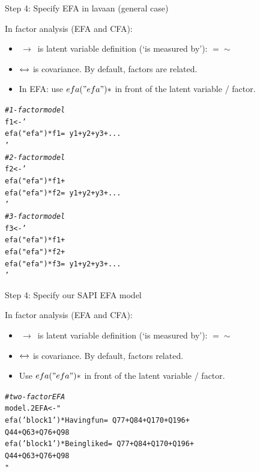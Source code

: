 \documentclass[10pt]{beamer}\usepackage[]{graphicx}\usepackage[]{xcolor}
\makeatletter
\newcommand{\hlstr}[1]{\textcolor[rgb]{0.192,0.494,0.8}{#1}}%
\newcommand{\hlcom}[1]{\textcolor[rgb]{0.678,0.584,0.686}{\textit{#1}}}%
\newcommand{\hlstd}[1]{\textcolor[rgb]{0.345,0.345,0.345}{#1}}%
\newcommand{\hlkwb}[1]{\textcolor[rgb]{0.69,0.353,0.396}{#1}}%
\newenvironment{kframe}{%
 \def\at@end@of@kframe{}%
 \ifinner\ifhmode%
  \def\at@end@of@kframe{\end{minipage}}%
  \begin{minipage}{\columnwidth}%
 \fi\fi%
 \def\FrameCommand##1{\hskip\@totalleftmargin \hskip-\fboxsep
 \colorbox{shadecolor}{##1}\hskip-\fboxsep
     \hskip-\linewidth \hskip-\@totalleftmargin \hskip\columnwidth}%
 \MakeFramed {\advance\hsize-\width
   \@totalleftmargin\z@ \linewidth\hsize
   \@setminipage}}%
 {\par\unskip\endMakeFramed%
 \at@end@of@kframe}
\newenvironment{knitrout}{}{} %
\makeatother
\begin{document}
%
\begin{frame}[fragile]{Step 4: Specify EFA in lavaan (general case)}

In factor analysis (EFA and CFA):
\begin{itemize}
  \item $\,\to\,$ is latent variable definition (`is measured by'): $=\sim$ 
  \item $\xleftrightarrow{}$ is covariance. By default, factors are related. %
  \item In EFA: use $efa("efa")*$ in front of the latent variable / factor.
\end{itemize}

\begin{knitrout}
\color{fgcolor}\begin{kframe}
\begin{alltt}
\hlcom{# 1-factor model}
\hlstd{f1} \hlkwb{<-} \hlstr{'
efa("efa")*f1 =~ y1 + y2 + y3 + ...
'}
\hlcom{# 2-factor model}
\hlstd{f2} \hlkwb{<-} \hlstr{'
efa("efa")*f1 +
efa("efa")*f2 =~ y1 + y2 + y3 + ...
'}
\hlcom{# 3-factor model}
\hlstd{f3} \hlkwb{<-} \hlstr{'
efa("efa")*f1 +
efa("efa")*f2 +
efa("efa")*f3 =~ y1 + y2 + y3 + ...
'}
\end{alltt}
\end{kframe}
\end{knitrout}

\end{frame}
%
\begin{frame}[fragile]{Step 4: Specify our SAPI EFA model}

In factor analysis (EFA and CFA):
\begin{itemize}
  \item $\,\to\,$ is latent variable definition (`is measured by'): $=\sim$ 
  \item $\xleftrightarrow{}$ is covariance. By default, factors related. %
  \item Use $efa("efa")*$ in front of the latent variable / factor.
\end{itemize}

\begin{knitrout}
\color{fgcolor}\begin{kframe}
\begin{alltt}
\hlcom{# two-factor EFA}
\hlstd{model.2EFA} \hlkwb{<-} \hlstr{"
 efa('block1')*Having fun  =~ Q77 + Q84 + Q170 + Q196 + 
                              Q44 + Q63 + Q76  + Q98
 efa('block1')*Being liked =~ Q77 + Q84 + Q170 + Q196 + 
                              Q44 + Q63 + Q76  + Q98
"}
\end{alltt}
\end{kframe}
\end{knitrout}

\end{frame}
\end{document}
